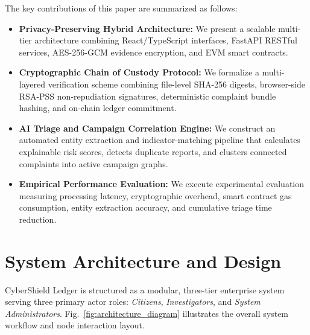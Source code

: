 \documentclass[conference]{IEEEtran}
\begin{document}
The key contributions of this paper are summarized as follows:
\begin{itemize}
    \item \textbf{Privacy-Preserving Hybrid Architecture:} We present a scalable multi-tier architecture combining React/TypeScript interfaces, FastAPI RESTful services, AES-256-GCM evidence encryption, and EVM smart contracts.
    \item \textbf{Cryptographic Chain of Custody Protocol:} We formalize a multi-layered verification scheme combining file-level SHA-256 digests, browser-side RSA-PSS non-repudiation signatures, deterministic complaint bundle hashing, and on-chain ledger commitment.
    \item \textbf{AI Triage and Campaign Correlation Engine:} We construct an automated entity extraction and indicator-matching pipeline that calculates explainable risk scores, detects duplicate reports, and clusters connected complaints into active campaign graphs.
    \item \textbf{Empirical Performance Evaluation:} We execute experimental evaluation measuring processing latency, cryptographic overhead, smart contract gas consumption, entity extraction accuracy, and cumulative triage time reduction.
\end{itemize}

\section{System Architecture and Design}
CyberShield Ledger is structured as a modular, three-tier enterprise system serving three primary actor roles: \textit{Citizens}, \textit{Investigators}, and \textit{System Administrators}. Fig.~\ref{fig:architecture_diagram} illustrates the overall system workflow and node interaction layout.
\end{document}
